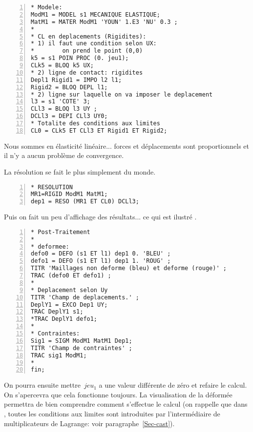 \color{gris}\scriptsize
\begin{multicols}{2}
\begin{Verbatim}[numbers=left,numbersep=3pt,firstnumber=last]
* Modele:
ModM1 = MODEL s1 MECANIQUE ELASTIQUE;
MatM1 = MATER ModM1 'YOUN' 1.E3 'NU' 0.3 ;
*
* CL en deplacements (Rigidites):
* 1) il faut une condition selon UX: 
*        on prend le point (0,0)
k5 = s1 POIN PROC (0. jeu1);
CLk5 = BLOQ k5 UX;
* 2) ligne de contact: rigidites
Depl1 Rigid1 = IMPO l2 l1;
Rigid2 = BLOQ DEPL l1;
* 2) ligne sur laquelle on va imposer le deplacement
l3 = s1 'COTE' 3;
CLl3 = BLOQ l3 UY ;
DCLl3 = DEPI CLl3 UY0;
* Totalite des conditions aux limites
CL0 = CLk5 ET CLl3 ET Rigid1 ET Rigid2;
\end{Verbatim}
\end{multicols}
\color{black}\normalsize

\medskip
Nous sommes en élasticité linéaire... forces et déplacements sont proportionnels et il n'y a aucun problème de convergence.

La résolution se fait le plus simplement du monde.

\color{gris}\scriptsize
\begin{Verbatim}[numbers=left,numbersep=3pt,firstnumber=last]
* RESOLUTION
MR1=RIGID ModM1 MatM1;
dep1 = RESO (MR1 ET CL0) DCLl3;
\end{Verbatim}
\color{black}\normalsize

\medskip
Puis on fait un peu d'affichage des résultats... ce qui est ilustré .

\color{gris}\scriptsize
\begin{multicols}{2}
\begin{Verbatim}[numbers=left,numbersep=3pt,firstnumber=last]
* Post-Traitement
*
* deformee:
defo0 = DEFO (s1 ET l1) dep1 0. 'BLEU' ;
defo1 = DEFO (s1 ET l1) dep1 1. 'ROUG' ;
TITR 'Maillages non deforme (bleu) et deforme (rouge)' ;
TRAC (defo0 ET defo1) ;
*
* Deplacement selon Uy
TITR 'Champ de deplacements.' ;
DeplY1 = EXCO Dep1 UY;
TRAC DeplY1 s1;
*TRAC DeplY1 defo1;
*
* Contraintes:
Sig1 = SIGM ModM1 MatM1 Dep1;
TITR 'Champ de contraintes' ;
TRAC sig1 ModM1;
*
fin;
\end{Verbatim}
\end{multicols}
\color{black}\normalsize

\medskip
On pourra ensuite mettre~$jeu_1$ a une valeur différente de zéro et refaire le calcul. On s'apercevra que cela fonctionne toujours. La visualisation de la déformée permettra de bien comprendre comment s'effectue le calcul (on rappelle que dans \castem, toutes les conditions aux limites sont introduites par l'intermédiaire de multiplicateurs de Lagrange: voir paragraphe~\ref{Sec-cast}).


